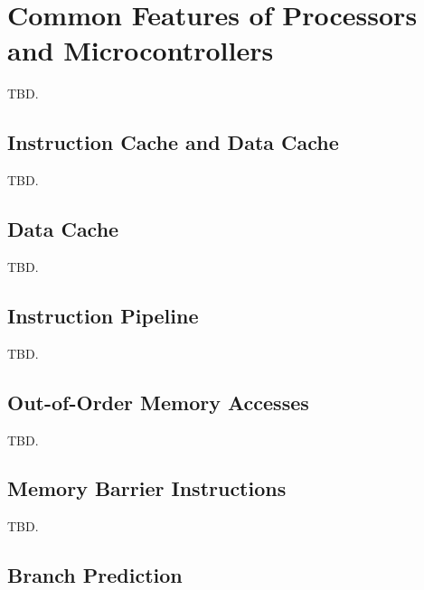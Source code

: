 \section{Common Features of Processors and Microcontrollers}
\label{scfp0}

TBD.


\subsection{Instruction Cache and Data Cache}
\label{scfp0:sica0}

TBD.


\subsection{Data Cache}
\label{scfp0:sdca0}

TBD.


\subsection{Instruction Pipeline}
\label{scfp0:spip0}

TBD.


\subsection{Out-of-Order Memory Accesses}
\label{scfp0:soom0}

TBD.


\subsection{Memory Barrier Instructions}
\label{scfp0:smbi0}

TBD.


\subsection{Branch Prediction}
\label{scfp0:sbpd0}

